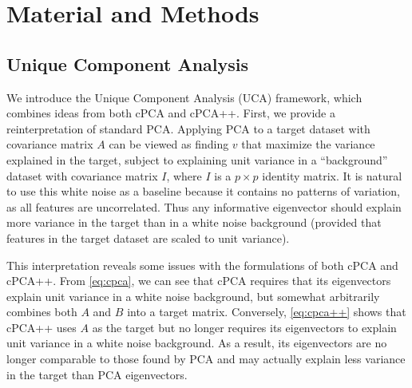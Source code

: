 \documentclass[12pt]{article}
\begin{document}
\section{Material and Methods\label{sec:method}}



\subsection{Unique Component Analysis}
We introduce the Unique Component Analysis (UCA) framework, which combines ideas from both cPCA and cPCA++. First, we provide a reinterpretation of standard PCA. Applying PCA to a target dataset with covariance matrix $A$ can be viewed as finding $v$ that maximize the variance explained in the target, subject to explaining unit variance in a ``background'' dataset with covariance matrix $I$, where $I$ is a $p \times p$ identity matrix. It is natural to use this white noise as a baseline because it contains no patterns of variation, as all features are uncorrelated. Thus any informative eigenvector should explain more variance in the target than in a white noise background (provided that features in the target dataset are scaled to unit variance).

This interpretation reveals some issues with the formulations of both cPCA and cPCA++. From \eqref{eq:cpca}, we can see that cPCA requires that its eigenvectors explain unit variance in a white noise background, but somewhat arbitrarily combines both $A$ and $B$ into a target matrix. Conversely, \eqref{eq:cpca++} shows that cPCA++ uses $A$ as the target but no longer requires its eigenvectors to explain unit variance in a white noise background. As a result, its eigenvectors are no longer comparable to those found by PCA and may actually explain less variance in the target than PCA eigenvectors.
\end{document}
